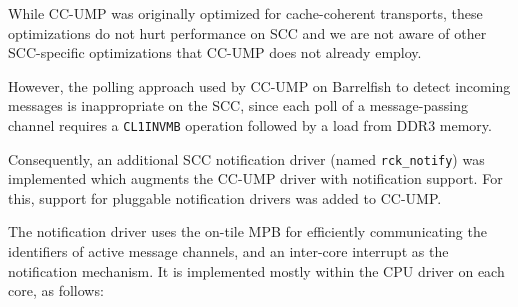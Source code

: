 \documentclass[a4paper,twoside]{report} %
\begin{document}
While CC-UMP was originally optimized for cache-coherent transports, these
optimizations do not hurt performance on SCC and we are not aware of other
SCC-specific optimizations that CC-UMP does not already employ.

However, the polling approach used by CC-UMP on Barrelfish to detect incoming
messages is inappropriate on the SCC, since each poll of a message-passing
channel requires a \texttt{CL1INVMB} operation followed by a load from DDR3
memory.

Consequently, an additional SCC notification driver (named
\texttt{rck\_notify}) was implemented which augments the CC-UMP driver
with notification support. For this, support for pluggable
notification drivers was added to CC-UMP.

The notification driver uses the on-tile MPB for efficiently
communicating the identifiers of active message channels, and
an inter-core interrupt as the notification mechanism. It is implemented
mostly within the CPU driver on each core, as follows: 
\end{document}
